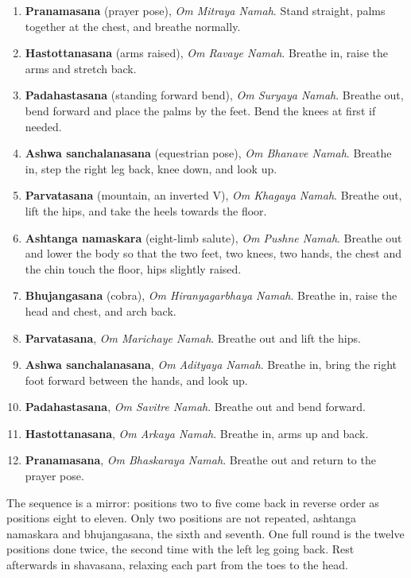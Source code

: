 \begin{enumerate}
\item \textbf{Pranamasana} (prayer pose), \emph{Om Mitraya Namah}. Stand straight, palms together at the chest, and breathe normally.
\item \textbf{Hastottanasana} (arms raised), \emph{Om Ravaye Namah}. Breathe in, raise the arms and stretch back.
\item \textbf{Padahastasana} (standing forward bend), \emph{Om Suryaya Namah}. Breathe out, bend forward and place the palms by the feet. Bend the knees at first if needed.
\item \textbf{Ashwa sanchalanasana} (equestrian pose), \emph{Om Bhanave Namah}. Breathe in, step the right leg back, knee down, and look up.
\item \textbf{Parvatasana} (mountain, an inverted V), \emph{Om Khagaya Namah}. Breathe out, lift the hips, and take the heels towards the floor.
\item \textbf{Ashtanga namaskara} (eight-limb salute), \emph{Om Pushne Namah}. Breathe out and lower the body so that the two feet, two knees, two hands, the chest and the chin touch the floor, hips slightly raised.
\item \textbf{Bhujangasana} (cobra), \emph{Om Hiranyagarbhaya Namah}. Breathe in, raise the head and chest, and arch back.
\item \textbf{Parvatasana}, \emph{Om Marichaye Namah}. Breathe out and lift the hips.
\item \textbf{Ashwa sanchalanasana}, \emph{Om Adityaya Namah}. Breathe in, bring the right foot forward between the hands, and look up.
\item \textbf{Padahastasana}, \emph{Om Savitre Namah}. Breathe out and bend forward.
\item \textbf{Hastottanasana}, \emph{Om Arkaya Namah}. Breathe in, arms up and back.
\item \textbf{Pranamasana}, \emph{Om Bhaskaraya Namah}. Breathe out and return to the prayer pose.
\end{enumerate}

The sequence is a mirror: positions two to five come back in reverse order as positions eight to eleven. Only two positions are not repeated, ashtanga namaskara and bhujangasana, the sixth and seventh. One full round is the twelve positions done twice, the second time with the left leg going back. Rest afterwards in shavasana, relaxing each part from the toes to the head.

